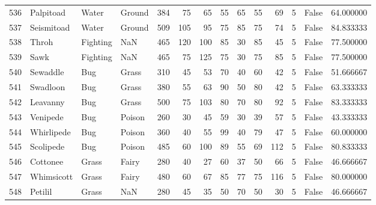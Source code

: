 \begin{tabular}{rlllrrrrrrrrlr}
 536 &                  Palpitoad &     Water &    Ground &    384 &   75 &      65 &       55 &       65 &       55 &     69 &           5 &      False &   64.000000 \\
 537 &                 Seismitoad &     Water &    Ground &    509 &  105 &      95 &       75 &       85 &       75 &     74 &           5 &      False &   84.833333 \\
 538 &                      Throh &  Fighting &       NaN &    465 &  120 &     100 &       85 &       30 &       85 &     45 &           5 &      False &   77.500000 \\
 539 &                       Sawk &  Fighting &       NaN &    465 &   75 &     125 &       75 &       30 &       75 &     85 &           5 &      False &   77.500000 \\
 540 &                   Sewaddle &       Bug &     Grass &    310 &   45 &      53 &       70 &       40 &       60 &     42 &           5 &      False &   51.666667 \\
 541 &                   Swadloon &       Bug &     Grass &    380 &   55 &      63 &       90 &       50 &       80 &     42 &           5 &      False &   63.333333 \\
 542 &                   Leavanny &       Bug &     Grass &    500 &   75 &     103 &       80 &       70 &       80 &     92 &           5 &      False &   83.333333 \\
 543 &                   Venipede &       Bug &    Poison &    260 &   30 &      45 &       59 &       30 &       39 &     57 &           5 &      False &   43.333333 \\
 544 &                 Whirlipede &       Bug &    Poison &    360 &   40 &      55 &       99 &       40 &       79 &     47 &           5 &      False &   60.000000 \\
 545 &                  Scolipede &       Bug &    Poison &    485 &   60 &     100 &       89 &       55 &       69 &    112 &           5 &      False &   80.833333 \\
 546 &                   Cottonee &     Grass &     Fairy &    280 &   40 &      27 &       60 &       37 &       50 &     66 &           5 &      False &   46.666667 \\
 547 &                 Whimsicott &     Grass &     Fairy &    480 &   60 &      67 &       85 &       77 &       75 &    116 &           5 &      False &   80.000000 \\
 548 &                    Petilil &     Grass &       NaN &    280 &   45 &      35 &       50 &       70 &       50 &     30 &           5 &      False &   46.666667 \\

\end{tabular}
